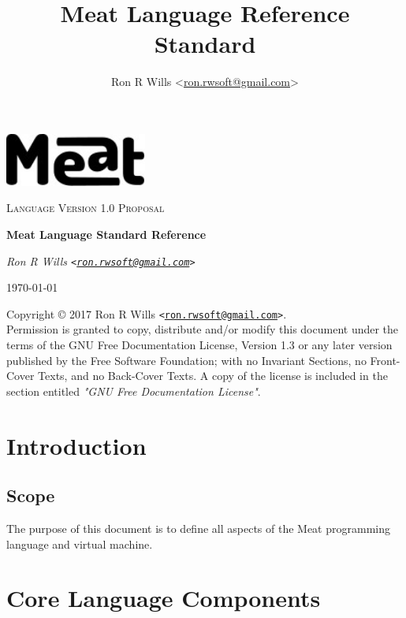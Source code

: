 \documentclass [10pt]{article}
\title {Meat Language Reference Standard}
\author {Ron R Wills \textless\href{mailto:ron.rwsoft@gmail.com}{ron.rwsoft@gmail.com}\textgreater}
\begin{document}
\begin{titlepage}
	\centering
	\includegraphics[width=0.35\textwidth]{meat-logo.jpg}\par\vspace{2cm}
	{\scshape\Large Language Version 1.0 Proposal\par}
	\vspace{1.5cm}
	{\huge\bfseries Meat Language Standard Reference\par}
	\vspace{2cm}
	{\Large\itshape Ron R Wills \texttt{\textless\href{mailto:ron.rwsoft@gmail.com}{ron.rwsoft@gmail.com}\textgreater}}\par

	\vfill

	{\large \today\par}
\end{titlepage}

\noindent{}Copyright \copyright{} 2017 Ron R Wills \texttt{\textless\href{mailto:ron.rwsoft@gmail.com}{ron.rwsoft@gmail.com}\textgreater}.\\[.5 cm]
Permission is granted to copy, distribute and/or modify this document
under the terms of the GNU Free Documentation License, Version 1.3
or any later version published by the Free Software Foundation;
with no Invariant Sections, no Front-Cover Texts, and no Back-Cover Texts.
A copy of the license is included in the section entitled \textit{"GNU
Free Documentation License"}.
\tableofcontents
\newpage
{}

\section {Introduction}
\subsection {Scope}
The purpose of this document is to define all aspects of the Meat programming language and virtual machine.

\newpage
\section {Core Language Components}
\end{document}
